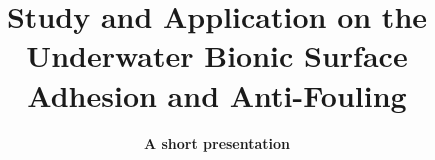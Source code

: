\documentclass{slides_NTU}
\title[About Beamer]{\textbf{Study and Application on the Underwater Bionic Surface Adhesion and Anti-Fouling}}
\subtitle{\textbf{A short presentation}}
\begin{document}
\LogoOn
	\begin{frame}
		\titlepage
	\end{frame}
\LogoOff

\graphicspath{{p_intro/}{p_simu/}{p_introsimu/}{p_simu20190610/}}








\end{document}

